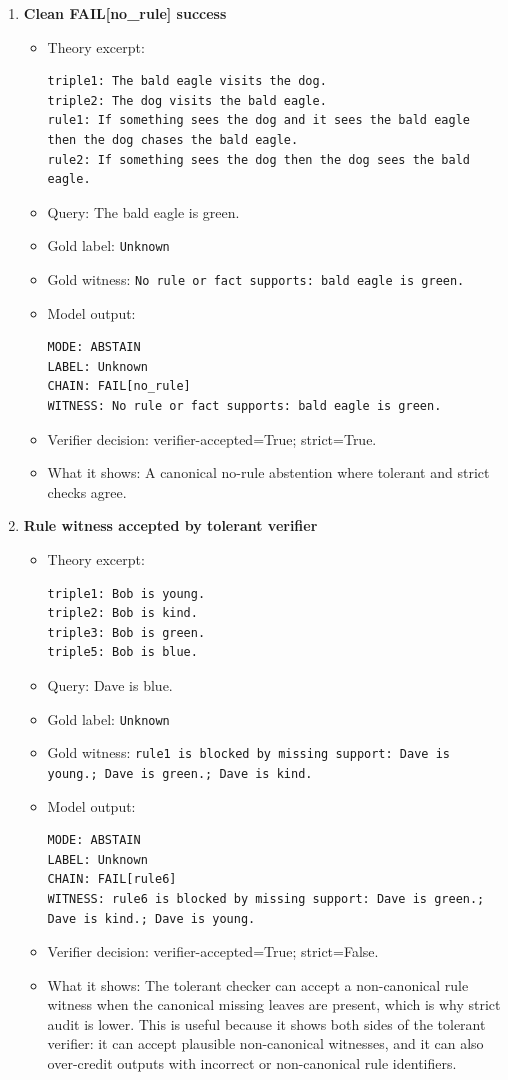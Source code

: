 \begin{enumerate}
\item \textbf{Clean FAIL[no\_rule] success}
\begin{itemize}
\item Theory excerpt:
\begin{verbatim}
triple1: The bald eagle visits the dog.
triple2: The dog visits the bald eagle.
rule1: If something sees the dog and it sees the bald eagle then the dog chases the bald eagle.
rule2: If something sees the dog then the dog sees the bald eagle.
\end{verbatim}
\item Query: The bald eagle is green.
\item Gold label: \texttt{Unknown}
\item Gold witness: \texttt{No rule or fact supports: bald eagle is green.}
\item Model output:
\begin{verbatim}
MODE: ABSTAIN
LABEL: Unknown
CHAIN: FAIL[no_rule]
WITNESS: No rule or fact supports: bald eagle is green.
\end{verbatim}
\item Verifier decision: verifier-accepted=True; strict=True.
\item What it shows: A canonical no-rule abstention where tolerant and strict checks agree.
\end{itemize}

\item \textbf{Rule witness accepted by tolerant verifier}
\begin{itemize}
\item Theory excerpt:
\begin{verbatim}
triple1: Bob is young.
triple2: Bob is kind.
triple3: Bob is green.
triple5: Bob is blue.
\end{verbatim}
\item Query: Dave is blue.
\item Gold label: \texttt{Unknown}
\item Gold witness: \texttt{rule1 is blocked by missing support: Dave is young.; Dave is green.; Dave is kind.}
\item Model output:
\begin{verbatim}
MODE: ABSTAIN
LABEL: Unknown
CHAIN: FAIL[rule6]
WITNESS: rule6 is blocked by missing support: Dave is green.; Dave is kind.; Dave is young.
\end{verbatim}
\item Verifier decision: verifier-accepted=True; strict=False.
\item What it shows: The tolerant checker can accept a non-canonical rule witness when the canonical missing leaves are present, which is why strict audit is lower. This is useful because it shows both sides of the tolerant verifier: it can accept plausible non-canonical witnesses, and it can also over-credit outputs with incorrect or non-canonical rule identifiers.
\end{itemize}


\end{enumerate}
